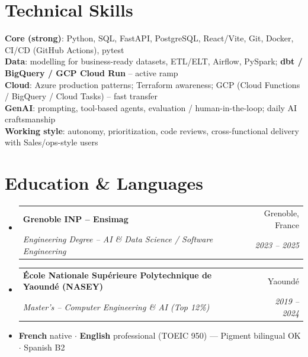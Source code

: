 \documentclass[letterpaper,10.5pt]{article}
\makeatletter
\newcommand{\resumeSubheading}[4]{%
  \vspace{3pt}\item
  \begin{tabular*}{0.97\textwidth}[t]{l@{\extracolsep{\fill}}r}
    \textbf{#1} & #2 \\
    \textit{\small #3} & \textit{\small #4} \\
  \end{tabular*}\vspace{1pt}
}
\newcommand{\resumeSubHeadingListStart}{\begin{itemize}[leftmargin=0.08in, label={}]}
\newcommand{\resumeSubHeadingListEnd}{\end{itemize}}
\makeatother
\begin{document}
\section{Technical Skills}
\begin{itemize}[leftmargin=0.08in, label={}]
\small{\item{
\textbf{Core (strong)}: Python, SQL, FastAPI, PostgreSQL, React/Vite, Git, Docker, CI/CD (GitHub Actions), pytest \\
\textbf{Data}: modelling for business-ready datasets, ETL/ELT, Airflow, PySpark; \textbf{dbt / BigQuery / GCP Cloud Run} -- active ramp \\
\textbf{Cloud}: Azure production patterns; Terraform awareness; GCP (Cloud Functions / BigQuery / Cloud Tasks) -- fast transfer \\
\textbf{GenAI}: prompting, tool-based agents, evaluation / human-in-the-loop; daily AI craftsmanship \\
\textbf{Working style}: autonomy, prioritization, code reviews, cross-functional delivery with Sales/ops-style users
}}
\end{itemize}

\section{Education \& Languages}
\resumeSubHeadingListStart
  \resumeSubheading
    {Grenoble INP -- Ensimag}{Grenoble, France}
    {Engineering Degree -- AI \& Data Science / Software Engineering}{2023 -- 2025}
  \resumeSubheading
    {\'Ecole Nationale Sup\'erieure Polytechnique de Yaound\'e (NASEY)}{Yaound\'e}
    {Master's -- Computer Engineering \& AI (Top 12\%)}{2019 -- 2024}
\resumeSubHeadingListEnd
\begin{itemize}[leftmargin=0.08in, label={}]
\item \textbf{French} native $\cdot$ \textbf{English} professional (TOEIC 950) --- Pigment bilingual OK $\cdot$ Spanish B2
\end{itemize}
\end{document}
